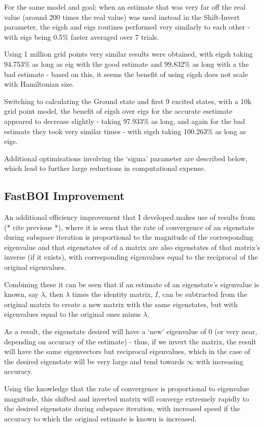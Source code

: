 For the same model and goal; when an estimate that was very far off the real value (around 200 times the real value) was used instead in the Shift-Invert parameter, the eigsh and eigs routines performed very similarly to each other - with eigs being 0.5\% faster averaged over 7 trials.

Using 1 million grid points very similar results were obtained, with eigsh taking 94.753\% as long as eig with the good estimate and 99.832\% as long with a the bad estimate - based on this, it seems the benefit of using eigsh does not scale with Hamiltonian size.

Switching to calculating the Ground state and first 9 excited states, with a 10k grid point model, the benefit of eigsh over eigs for the accurate esetimate appeared to decrease slightly - taking 97.933\% as long, and again for the bad estimate they took very similar times - with eigsh taking 100.263\% as long as eigs.

Additional optimisations involving the `sigma' parameter are described below, which lead to further large reductions in computational expense.

\subsection{FastBOI Improvement}
An additional efficiency improvement that I developed makes use of results from (* cite previous *), where it is seen that the rate of convergence of an eigenstate during subspace iteration is proportional to the magnitude of the corresponding eigenvalue and that eigenstates of of a matrix are also eigenstates of that matrix's inverse (if it exists), with corresponding eigenvalues equal to the reciprocal of the original eigenvalues. 

Combining these it can be seen that if an estimate of an eigenstate's eigenvalue is known, say $\lambda$, then $\lambda$ times the identity matrix, $I$, can be subtracted from the original matrix to create a new matrix with the same eigenstates, but with eigenvalues equal to the original ones minus $\lambda$. 

As a result, the eigenstate desired will have a `new' eigenvalue of $0$ (or very near, depending on accuracy of the estimate) - thus, if we invert the matrix, the result will have the same eigenvectors but reciprocal eigenvalues, which in the case of the desired eigenstate will be very large and tend towards $\infty$ with increasing accuracy. 

Using the knowledge that the rate of convergence is proportional to eigenvalue magnitude, this shifted and inverted matrix will converge extremely rapidly to the desired eigenstate during subspace iteration, with increased speed if the accuracy to which the original estimate is known is increased.

